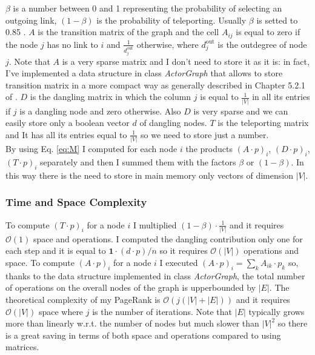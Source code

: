 \documentclass{article}
\begin{document}
$\beta$ is a number between 0 and 1 representing the probability of selecting an outgoing link, $(1-\beta)$ is the probability of teleporting. Usually $\beta$ is setted to 0.85 \cite{leskovec2014}. $A$ is the transition matrix of the graph and the cell $A_{ij}$ is equal to zero if the node $j$ has no link to $i$ and $\frac{1}{d^{\mathrm{out}}_{j}}$ otherwise, where $d^{\mathrm{out}}_{j}$ is the outdegree of node $j$. Note that $A$ is a very sparse matrix and I don't need to store it as it is: in fact, I've implemented a data structure in class \textit{ActorGraph} that allows to store transition matrix in a more compact way as generally described in Chapter 5.2.1 of \cite{leskovec2014}. $D$ is the dangling matrix in which the column $j$ is equal to $\frac{1}{|V|}$ in all its entries if $j$ is a dangling node and zero otherwise. Also $D$ is very sparse and we can easily store only a boolean vector $d$ of dangling nodes. $T$ is the teleporting matrix and It has all its entries equal to $\frac{1}{|V|}$ so we need to store just a number.\\
By using Eq. \ref{eq:M} I computed for each node $i$ the products $(A \cdot p)_{i}$, $(D \cdot p)_{i}$, $(T \cdot p)_{i}$ separately and then I summed them with the factors $\beta$ or $(1-\beta)$. In this way there is the need to store in main memory only vectors of dimension $|V|$.

\subsubsection{Time and Space Complexity}
To compute $(T \cdot p)_{i}$ for a node $i$ I multiplied $(1-\beta)\cdot \frac{1}{|V|}$ and it requires $\mathcal{O}(1)$ space and operations. I computed the dangling contribution only one for each step and it is equal to $\mathbf{1}\cdot(d\cdot p)/n$ so it requires $\mathcal{O}(|V|)$ operations and space. To compute $(A \cdot p)_{i}$ for a node $i$ I executed $(A \cdot p)_{i} = \sum_{k} A_{ik}\cdot p_{k}$ so, thanks to the data structure implemented in class \textit{ActorGraph}, the total number of operations on the overall nodes of the graph is upperbounded by $|E|$. The theoretical complexity of my PageRank is $\mathcal{O}(j(|V| + |E|))$ and it requires $\mathcal{O}(|V|)$ space where $j$ is the number of iterations. Note that $|E|$ typically grows more than linearly w.r.t. the number of nodes but much slower than $|V|^{2}$ \cite{densification} so there is a great saving in terms of both space and operations compared to using matrices.
\end{document}
